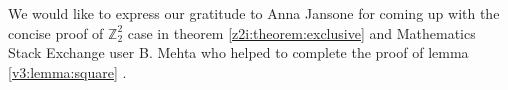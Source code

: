 We would like to express our gratitude to Anna Jansone for coming
up with the concise proof of $\mathbb Z_2^2$ case in theorem 
\ref{z2i:theorem:exclusive} \cite{jansone_z2_2} and Mathematics 
Stack Exchange user B. Mehta who helped to complete the proof of
lemma \ref{v3:lemma:square} \cite{math_se_mehta}.